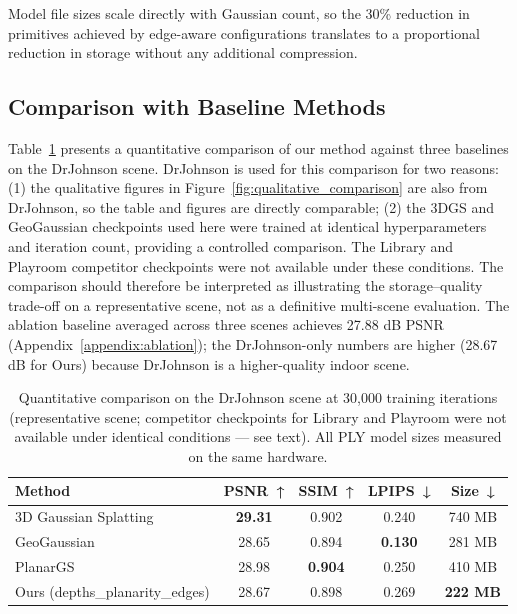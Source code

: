 Model file sizes scale directly with Gaussian count, so the 30\% reduction in primitives achieved by edge-aware configurations translates to a proportional reduction in storage without any additional compression.

\subsection{Comparison with Baseline Methods}

Table~\ref{tab:method_comparison} presents a quantitative comparison of our method against three baselines on the DrJohnson scene. DrJohnson is used for this comparison for two reasons: (1) the qualitative figures in Figure~\ref{fig:qualitative_comparison} are also from DrJohnson, so the table and figures are directly comparable; (2) the 3DGS and GeoGaussian checkpoints used here were trained at identical hyperparameters and iteration count, providing a controlled comparison. The Library and Playroom competitor checkpoints were not available under these conditions. The comparison should therefore be interpreted as illustrating the storage--quality trade-off on a representative scene, not as a definitive multi-scene evaluation. The ablation baseline averaged across three scenes achieves 27.88 dB PSNR (Appendix~\ref{appendix:ablation}); the DrJohnson-only numbers are higher (28.67 dB for Ours) because DrJohnson is a higher-quality indoor scene.

\begin{table}[h]
\centering
\caption{Quantitative comparison on the DrJohnson scene at 30{,}000 training iterations (representative scene; competitor checkpoints for Library and Playroom were not available under identical conditions — see text). All PLY model sizes measured on the same hardware.}
\label{tab:method_comparison}
\begin{tabular}{lcccc}
\toprule
\textbf{Method} & \textbf{PSNR~↑} & \textbf{SSIM~↑} & \textbf{LPIPS~↓} & \textbf{Size~↓} \\
\midrule
3D Gaussian Splatting~\cite{kerbl20233dgs} & \textbf{29.31} & 0.902 & 0.240 & 740 MB \\
GeoGaussian~\cite{geogaussian}             & 28.65 & 0.894 & \textbf{0.130} & 281 MB \\
PlanarGS~\cite{planargs}                   & 28.98 & \textbf{0.904} & 0.250 & 410 MB \\
Ours (depths\_planarity\_edges)            & 28.67 & 0.898 & 0.269 & \textbf{222 MB} \\
\bottomrule
\end{tabular}
\end{table}

